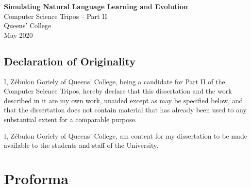 \documentclass[12pt,a4paper]{report}
\begin{document}



\pagestyle{empty}

\vspace*{2mm}

\vspace*{60mm}
\begin{adjustwidth}{40pt}{40pt}
\begin{center}
\Huge
\textbf{Simulating Natural Language Learning and Evolution} \\[15mm]
\Large
Computer Science Tripos -- Part II \\[3mm]
Queens' College \\[3mm]
May 2020 \\[3mm]
\end{center}
\end{adjustwidth}


\pagestyle{plain}

\newpage
\section*{Declaration of Originality}

I, Z\'ebulon Goriely of Queens' College, being a candidate for Part II of the Computer
Science Tripos, hereby declare
that this dissertation and the work described in it are my own work,
unaided except as may be specified below, and that the dissertation
does not contain material that has already been used to any substantial
extent for a comparable purpose.

I, Z\'ebulon Goriely of Queens' College, am content for my dissertation to be made available to the students and staff of the University.

\bigskip
{}

\medskip
{}

\chapter*{Proforma}
\end{document}
